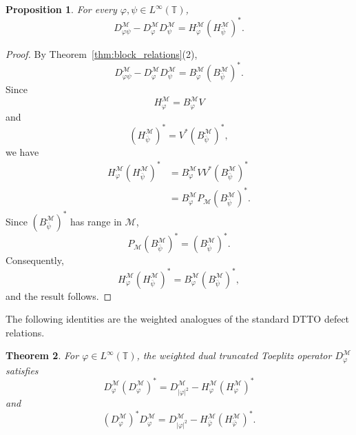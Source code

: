 \documentclass[12pt]{amsart}
\newtheorem{theorem}{Theorem}[section]
\newtheorem{proposition}[theorem]{Proposition}
\theoremstyle{definition}
\theoremstyle{remark}
\def \T{\mathbb{T}}
\newcommand{\clm}{\mathcal{M}}
\newcommand{\vp}{\varphi}
\numberwithin{equation}{section}
\begin{document}
\begin{proposition}\label{prop:weighted-semicommutator}
For every $\vp,\psi\in L^\infty(\T)$,
\[
D_{\vp\psi}^\clm
-
D_\vp^\clm D_\psi^\clm
=
H_\vp^\clm(H_{\bar\psi}^\clm)^*.
\]
\end{proposition}

\begin{proof}
By Theorem~\ref{thm:block_relations}\textup{(2)},
\[
D_{\vp\psi}^\clm-D_\vp^\clm D_\psi^\clm
=
B_\vp^\clm(B_{\bar\psi}^\clm)^*.
\]
Since
\[
H_\vp^\clm=B_\vp^\clm V
\]
and
\[
(H_{\bar\psi}^\clm)^*
=
V^*(B_{\bar\psi}^\clm)^*,
\]
we have
\begin{align*}
H_\vp^\clm(H_{\bar\psi}^\clm)^*
&=
B_\vp^\clm VV^*(B_{\bar\psi}^\clm)^* \\
&=
B_\vp^\clm P_\clm(B_{\bar\psi}^\clm)^*.
\end{align*}
Since $(B_{\bar\psi}^\clm)^*$ has range in $\clm$,
\[
P_\clm(B_{\bar\psi}^\clm)^*
=
(B_{\bar\psi}^\clm)^*.
\]
Consequently,
\[
H_\vp^\clm(H_{\bar\psi}^\clm)^*
=
B_\vp^\clm(B_{\bar\psi}^\clm)^*,
\]
and the result follows.
\end{proof}
The following identities are the weighted analogues of the standard DTTO defect relations.

\begin{theorem}\label{thm:defect}
For $\vp\in L^\infty(\T)$, the weighted dual truncated Toeplitz operator
$D_\vp^\clm$ satisfies
\[
D_\vp^\clm(D_\vp^\clm)^*
=
D_{|\vp|^2}^\clm
-
H_\vp^\clm(H_\vp^\clm)^*
\]
and
\[
(D_\vp^\clm)^*D_\vp^\clm
=
D_{|\vp|^2}^\clm
-
H_{\bar\vp}^\clm(H_{\bar\vp}^\clm)^* .
\]
\end{theorem}
\end{document}
